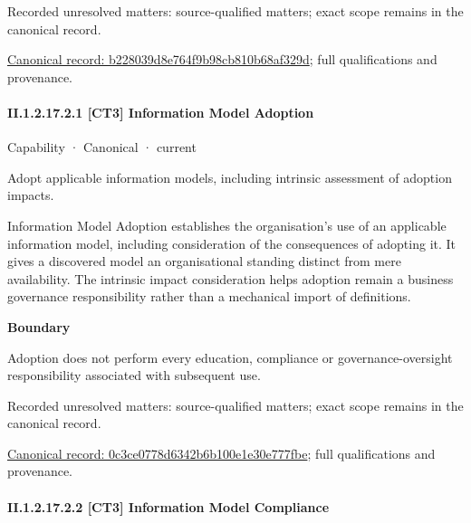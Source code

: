 {\small Recorded unresolved matters: source-qualified matters; exact scope remains in the canonical record.}\par
{\footnotesize \href{../../../../../../../continuum/strategy/capability/b228039d8e764f9b98cb810b68af329d.md}{Canonical record: b228039d8e764f9b98cb810b68af329d}; full qualifications and provenance.}\par
\paragraph*{II.1.2.17.2.1 [CT3] Information Model Adoption}
\label{navigation:II.1.2.17.2.1}

\label{element:0c3ce0778d6342b6b100e1e30e777fbe}
{\small Capability · Canonical · current}\par

Adopt applicable information models, including intrinsic assessment of adoption impacts.



Information Model Adoption establishes the organisation's use of an applicable information model, including consideration of the consequences of adopting it. It gives a discovered model an organisational standing distinct from mere availability. The intrinsic impact consideration helps adoption remain a business governance responsibility rather than a mechanical import of definitions.



\textbf{Boundary}



Adoption does not perform every education, compliance or governance-oversight responsibility associated with subsequent use.


{\small Recorded unresolved matters: source-qualified matters; exact scope remains in the canonical record.}\par
{\footnotesize \href{../../../../../../../continuum/strategy/capability/0c3ce0778d6342b6b100e1e30e777fbe.md}{Canonical record: 0c3ce0778d6342b6b100e1e30e777fbe}; full qualifications and provenance.}\par
\paragraph*{II.1.2.17.2.2 [CT3] Information Model Compliance}
\label{navigation:II.1.2.17.2.2}

